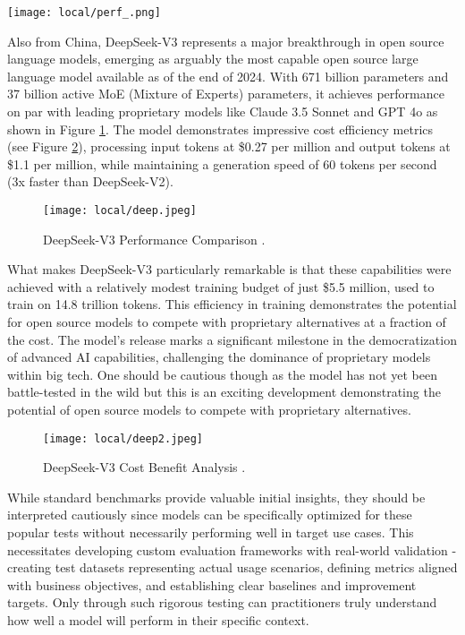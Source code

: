 \begin{figure*}[h!]
\centering
\texttt{[image: local/perf\_.png]}
\caption{Performance Comparison including proprietary models as reported by Artificial Analysis in Nov'24.}
\label{fig:perf_}
\end{figure*}

Also from China, DeepSeek-V3  represents a major breakthrough in open source language models, emerging as arguably the most capable open source large language model available as of the end of 2024. With 671 billion parameters and 37 billion active MoE (Mixture of Experts) parameters, it achieves performance on par with leading proprietary models like Claude 3.5 Sonnet and GPT 4o as shown in Figure \ref{fig:deep}. The model demonstrates impressive cost efficiency metrics (see Figure \ref{fig:deep2}), processing input tokens at \$0.27 per million and output tokens at \$1.1 per million, while maintaining a generation speed of 60 tokens per second (3x faster than DeepSeek-V2).

\begin{figure}[H]
\centering
\texttt{[image: local/deep.jpeg]}
\caption{DeepSeek-V3 Performance Comparison \cite{deepseek2024tweet}.}
\label{fig:deep}
\end{figure}

What makes DeepSeek-V3 particularly remarkable is that these capabilities were achieved with a relatively modest training budget of just \$5.5 million, used to train on 14.8 trillion tokens. This efficiency in training demonstrates the potential for open source models to compete with proprietary alternatives at a fraction of the cost. The model's release marks a significant milestone in the democratization of advanced AI capabilities, challenging the dominance of proprietary models within big tech. One should be cautious though as the model has not yet been battle-tested in the wild but this is an exciting development demonstrating the potential of open source models to compete with proprietary alternatives.


\begin{figure}[H]
\centering
\texttt{[image: local/deep2.jpeg]}
\caption{DeepSeek-V3 Cost Benefit Analysis \cite{deepseek2024tweet}.}
\label{fig:deep2}
\end{figure}

While standard benchmarks provide valuable initial insights, they should be interpreted cautiously since models can be specifically optimized for these popular tests without necessarily performing well in target use cases. This necessitates developing custom evaluation frameworks with real-world validation - creating test datasets representing actual usage scenarios, defining metrics aligned with business objectives, and establishing clear baselines and improvement targets. Only through such rigorous testing can practitioners truly understand how well a model will perform in their specific context.

